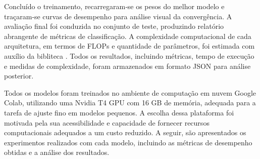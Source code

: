 Concluído o treinamento, recarregaram‑se os pesos do melhor modelo e traçaram‑se curvas de desempenho para análise visual da convergência. A avaliação final foi conduzida no conjunto de teste, produzindo relatório abrangente de métricas de classificação. A complexidade computacional de cada arquitetura, em termos de FLOPs e quantidade de parâmetros, foi estimada com auxílio da bibliteca \cite{ptflops}. Todos os resultados, incluindo métricas, tempo de execução e medidas de complexidade, foram armazenados em formato JSON para análise posterior.

Todos os modelos foram treinados no ambiente de computação em nuvem Google Colab, utilizando uma Nvidia T4 GPU com 16 GB de memória, adequada para a tarefa de ajuste fino em modelos pequenos. A escolha dessa plataforma foi motivada pela sua acessibilidade e capacidade de fornecer recursos computacionais adequados a um custo reduzido. A seguir, são apresentados os experimentos realizados com cada modelo, incluindo as métricas de desempenho obtidas e a análise dos resultados.